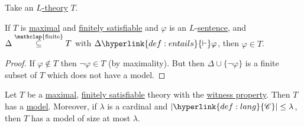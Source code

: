 \documentclass{article}
\newcommand{\named}[1]{\textbf{#1}\index{#1}}
\begin{document}
\begin{ndef}\label{def:5.1x}
  Take an \hyperlink{def:ltheory}{$L$-theory} $T$.
\end{ndef}
\begin{nlemma}\label{lem:5.2x}
  If $T$ is \hyperlink{def:maximal}{maximal} and \hyperlink{def:fs}{finitely satisfiable} and $\varphi$ is an $L$-\hyperlink{def:sentence}{sentence}, and $\Delta \overset{\mathclap{\text{finite}}}\subseteq T$ with $\Delta \hyperlink{def:entails}{\vdash} \varphi$, then $\varphi \in T$.
\end{nlemma}
\begin{proof}
  If $\varphi \notin T$ then $\neg \varphi \in T$ (by maximality).
  But then $\Delta \cup \{\neg \varphi\}$ is a finite subset of $T$ which does not have a model.
\end{proof}
\begin{nlemma}\label{lem:5.3x}
  Let $T$ be a \hyperlink{def:maximal}{maximal}, \hyperlink{def:fs}{finitely satisfiable} theory with the \hyperlink{def:wp}{witness property}.
  Then $T$ has a \hyperlink{def:model}{model}.
  Moreover, if $\lambda$ is a cardinal and $|\hyperlink{def:lang}{\mathscr{C}}| \leq \lambda$, then $T$ has a model of size at most $\lambda$.
\end{nlemma}
\end{document}
